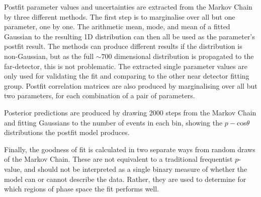 Postfit parameter values and uncertainties are extracted from the Markov Chain by three different methods. The first step is to marginalise over all but one parameter, one by one. The arithmetic mean, mode, and mean of a fitted Gaussian to the resulting 1D distribution can then all be used as the parameter's postfit result. The methods can produce different results if the distribution is non-Gaussian, but as the full $\sim700$ dimensional distribution is propagated to the far-detector, this is not problematic. The extracted single parameter values are only used for validating the fit and comparing to the other near detector fitting group. Postfit correlation matrices are also produced by marginalising over all but two parameters, for each combination of a pair of parameters.

Posterior predictions are produced by drawing 2000 steps from the Markov Chain and fitting Gaussians to the number of events in each bin, showing the $p-$cos$\theta$ distributions the postfit model produces.

Finally, the goodness of fit is calculated in two separate ways from random draws of the Markov Chain. These are not equivalent to a traditional frequentist $p$-value, and should not be interpreted as a single binary measure of whether the model can or cannot describe the data. Rather, they are used to determine for which regions of phase space the fit performs well.

\newpage